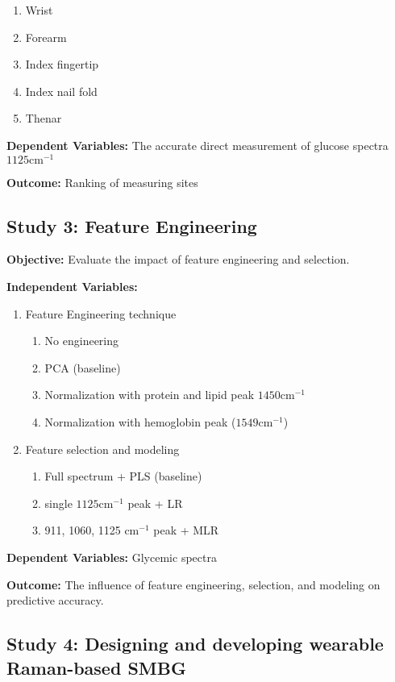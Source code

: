 \begin{enumerate}
    \item Wrist
    \item Forearm
    \item Index fingertip
    \item Index nail fold
    \item Thenar
\end{enumerate}

\textbf{Dependent Variables:} The accurate direct measurement of glucose spectra  \( 1125 \text{cm}^{-1} \)


\textbf{Outcome:} Ranking of measuring sites

\subsection{Study 3: Feature Engineering}

\textbf{Objective:} Evaluate the impact of feature engineering and selection.

\textbf{Independent Variables:} 

\begin{enumerate}
    \item Feature Engineering technique
    \begin{enumerate}
        \item No engineering
        \item PCA (baseline)
        \item Normalization with protein and lipid peak \( 1450 \text{cm}^{-1} \)
        \item Normalization with hemoglobin peak ($1549 \text{cm}^{-1}$)
    \end{enumerate}
    \item Feature selection and modeling
    \begin{enumerate}
        \item Full spectrum + PLS (baseline) 
        \item single $1125 \text{cm}^{-1}$ peak + LR 
        \item 911, 1060, 1125 $\text{cm}^{-1}$ peak + MLR 
    \end{enumerate}
\end{enumerate}


\textbf{Dependent Variables:} Glycemic spectra

\textbf{Outcome:} The influence of feature engineering, selection, and modeling on predictive accuracy.

\subsection{Study 4: Designing and developing wearable Raman-based SMBG}


